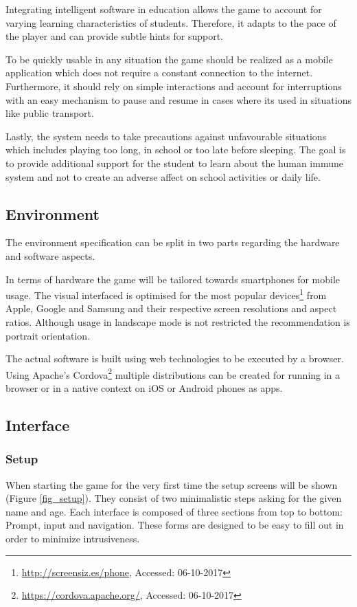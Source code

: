 Integrating intelligent software in education allows the game to account for varying learning characteristics of students.
Therefore, it adapts to the pace of the player and can provide subtle hints for support.

To be quickly usable in any situation the game should be realized as a mobile application which does not require a constant connection to the internet.
Furthermore, it should rely on simple interactions and account for interruptions with an easy mechanism to pause and resume in cases where its used in situations like public transport.

Lastly, the system needs to take precautions against unfavourable situations which includes playing too long, in school or too late before sleeping. The goal is to provide additional support for the student to learn about the human immune system and not to create an adverse affect on school activities or daily life.

\subsection{Environment} \label{environment}
The environment specification can be split in two parts regarding the hardware and software aspects.

In terms of hardware the game will be tailored towards smartphones for mobile usage. The visual interfaced is optimised for the most popular devices\footnote{\url{http://screensiz.es/phone}, Accessed: 06-10-2017} from Apple, Google and Samsung and their respective screen resolutions and aspect ratios. Although usage in landscape mode is not restricted the recommendation is portrait orientation.

The actual software is built using web technologies to be executed by a browser. Using Apache's Cordova\footnote{\url{https://cordova.apache.org/}, Accessed: 06-10-2017} multiple distributions can be created for running in a browser or in a native context on iOS or Android phones as apps.

\subsection{Interface} \label{interface}

\subsubsection{Setup} \label{setup-interface}
When starting the game for the very first time the setup screens will be shown (Figure \ref{fig_setup}). They consist of two minimalistic steps asking for the given name and age. Each interface is composed of three sections from top to bottom: Prompt, input and navigation. These forms are designed to be easy to fill out in order to minimize intrusiveness.

